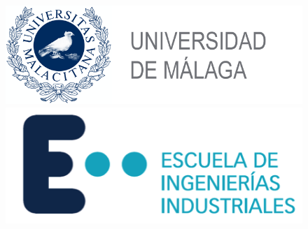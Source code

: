 
\begin{figure}[H]
        \hspace{-0.5cm}	
		\includegraphics[scale=0.25]{./1-Portada/img/logoUma}
		\hspace{6cm}
		\includegraphics[scale= 0.25]{./1-Portada/img/logoEscuela}\label{fig:figure3}
\end{figure}
\vspace*{0.2in}
